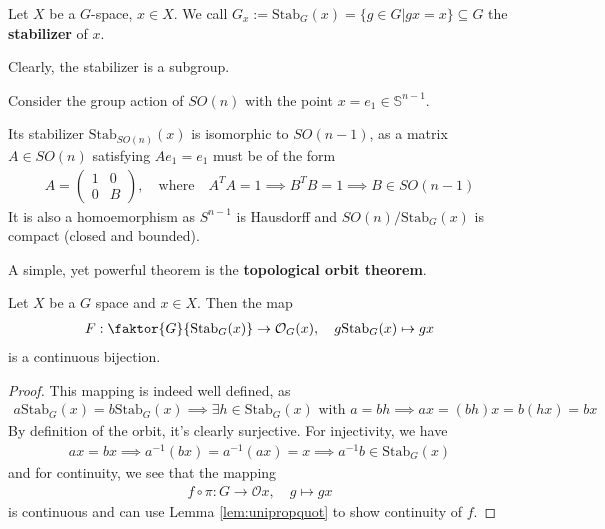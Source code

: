\begin{dfn}[]
Let $X$ be a $G$-space, $x \in X$. 
We call $G_x := \text{Stab}_G(x) = \{g \in G \big\vert gx = x\} \subseteq G$ the \textbf{stabilizer} of $x$.
\end{dfn}
Clearly, the stabilizer is a subgroup.

\begin{ex}[]
  Consider the group action of $SO(n)$ with the point $x = e_1 \in \mathbb{S}^{n-1}$.

  Its stabilizer $\text{Stab}_{SO(n)}(x)$ is isomorphic to $SO(n-1)$, as a matrix $A \in SO(n)$ satisfying $Ae_1 = e_1$ must be of the form
  \begin{align*}
    A = \begin{pmatrix}
    1 & 0\\
    0 & B
    \end{pmatrix}
    , \quad \text{where} \quad A^{T}A = 1 \implies B^{T}B = 1 \implies B \in SO(n-1)
  \end{align*}
  It is also a homoemorphism as $S^{n-1}$ is Hausdorff and $SO(n)/\text{Stab}_G(x)$ is compact (closed and bounded).
\end{ex}

A simple, yet powerful theorem is the \textbf{topological orbit theorem}.
\begin{thm}
Let $X$ be a $G$ space and $x \in X$.
Then the map
\begin{align*}
  F: \faktor{G}{\text{Stab}_{G}(x)} \to \mathcal{O}_G(x), \quad g \text{Stab}_G(x) \mapsto gx
\end{align*}
is a continuous bijection.
\end{thm}
\begin{proof}
  This mapping is indeed well defined, as
  \begin{align*}
    a \text{Stab}_G(x) = b \text{Stab}_G(x) \implies \exists h \in \text{Stab}_G(x) \text{ with } a = bh \implies ax = (bh)x = b(hx) = bx
  \end{align*}
  By definition of the orbit, it's clearly surjective.
  For injectivity, we have
  \begin{align*}
    ax = bx \implies a^{-1}(bx) = a^{-1}(ax) = x \implies a^{-1}b \in \text{Stab}_G(x)
  \end{align*}
  and for continuity, we see that the mapping
  \begin{align*}
    f \circ \pi: G \to \mathcal{O}x, \quad g \mapsto  gx
  \end{align*}
  is continuous and can use Lemma \ref{lem:unipropquot} to show continuity of $f$. 
\end{proof}


